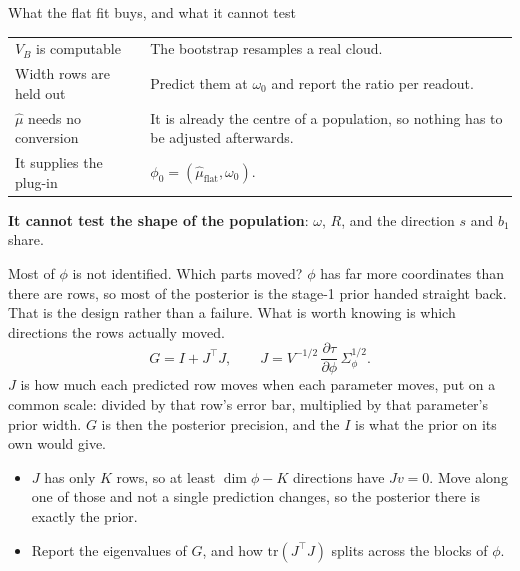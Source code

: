 \documentclass[10pt,aspectratio=169]{beamer}
\newcommand{\Tr}{^{\!\top}}
\begin{document}
\begin{frame}[t]{What the flat fit buys, and what it cannot test}
  \begin{center}\small
  \begin{tabularx}{\textwidth}{@{}lX@{}}
    \toprule
    $V_B$ is computable & The bootstrap resamples a real cloud. \\
    Width rows are held out & Predict them at $\omega_0$ and report the ratio per readout. \\
    $\hat\mu$ needs no conversion & It is already the centre of a population, so nothing has to be adjusted afterwards. \\
    It supplies the plug-in & $\phi_0=(\hat\mu_{\text{flat}},\omega_0)$. \\
    \bottomrule
  \end{tabularx}
  \end{center}
  \vfill
  \textbf{It cannot test the shape of the population}: $\omega$, $R$, and the
  direction $s$ and $b_1$ share.
\end{frame}

\begin{frame}[t]{Most of $\phi$ is not identified. Which parts moved?}
  $\phi$ has far more coordinates than there are rows, so most of the posterior
  is the stage-1 prior handed straight back. That is the design rather than a
  failure. What is worth knowing is which directions the rows actually moved.
  \[
    G = I + J\Tr J,
    \qquad J = V^{-1/2}\,\frac{\partial\tau}{\partial\phi}\,\Sigma_\phi^{1/2} .
  \]
  $J$ is how much each predicted row moves when each parameter moves, put on a
  common scale: divided by that row's error bar, multiplied by that parameter's
  prior width. $G$ is then the posterior precision, and the $I$ is what the prior
  on its own would give.
  \begin{itemize}
    \item $J$ has only $K$ rows, so at least $\dim\phi-K$ directions have
      $Jv=0$. Move along one of those and not a single prediction changes, so
      the posterior there is exactly the prior.
    \item Report the eigenvalues of $G$, and how $\mathrm{tr}(J\Tr J)$ splits
      across the blocks of $\phi$.
  \end{itemize}
\end{frame}
\end{document}
